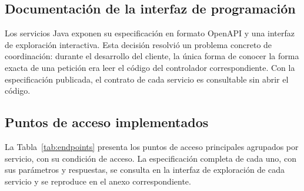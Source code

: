 \subsection{Documentación de la interfaz de programación}
Los servicios Java exponen su especificación en formato OpenAPI y una interfaz de exploración
interactiva. Esta decisión resolvió un problema concreto de coordinación: durante el desarrollo
del cliente, la única forma de conocer la forma exacta de una petición era leer el código del
controlador correspondiente. Con la especificación publicada, el contrato de cada servicio es
consultable sin abrir el código.

\subsection{Puntos de acceso implementados}
La Tabla~\ref{tab:endpoints} presenta los puntos de acceso principales agrupados por servicio,
con su condición de acceso. La especificación completa de cada uno, con sus parámetros y
respuestas, se consulta en la interfaz de exploración de cada servicio y se reproduce en el anexo
correspondiente.


\footnotesize
\renewcommand{\arraystretch}{1.2}
\setlength{\tabcolsep}{4pt}

